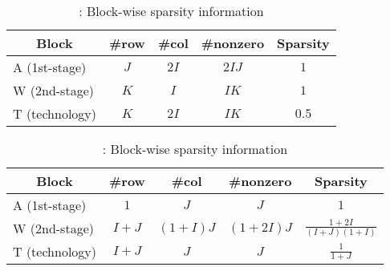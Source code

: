 \begin{table}[H]
	\centering
	\caption{\smkp: Block-wise sparsity information}
	\label{table:sparsity_SMKP}
	\begin{tabular}{@{}lcccc@{}}
		\toprule
		\multicolumn{1}{c}{Block} & \#row & \#col & \#nonzero & Sparsity \\ \midrule
		A (1st-stage)             & $J$   & $2I$  & $2IJ$     & $1$     \\
		W (2nd-stage)             & $K$   & $I$   & $IK$      & $1$     \\
		T (technology)          & $K$   & $2I$  & $IK$      & $0.5$   \\ \bottomrule
	\end{tabular}
\end{table}

\begin{table}[H]
	\centering
	\caption{\sslp: Block-wise sparsity information}
	\label{table:sparsity_SSLP}
	\begin{tabular}{@{}lcccc@{}}
		\toprule
		\multicolumn{1}{c}{Block} & \#row & \#col    & \#nonzero & Sparsity                   \\ \midrule
		A (1st-stage)             & $1$   & $J$      & $J$       & $1$                       \\
		W (2nd-stage)             & $I+J$ & $(1+I)J$ & $(1+2I)J$ & $\frac{1+2I}{(I+J)(1+I)}$ \\
		T (technology)          & $I+J$ & $J$      & $J$       & $\frac{1}{1+J}$           \\ \bottomrule
	\end{tabular}
\end{table}

